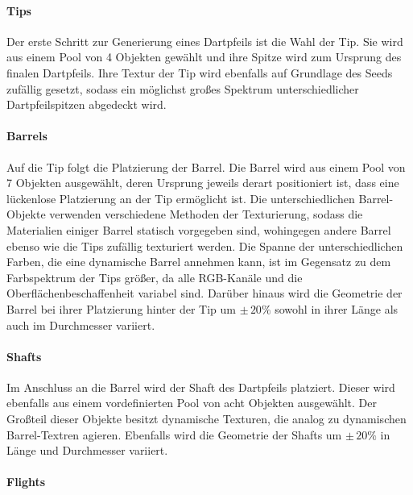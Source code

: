 \paragraph{Tips}

Der erste Schritt zur Generierung eines Dartpfeils ist die Wahl der Tip. Sie wird aus einem Pool von 4 Objekten gewählt und ihre Spitze wird zum Ursprung des finalen Dartpfeils. Ihre Textur der Tip wird ebenfalls auf Grundlage des Seeds zufällig gesetzt, sodass ein möglichst großes Spektrum unterschiedlicher Dartpfeilspitzen abgedeckt wird.

\paragraph{Barrels}

Auf die Tip folgt die Platzierung der Barrel. Die Barrel wird aus einem Pool von 7 Objekten ausgewählt, deren Ursprung jeweils derart positioniert ist, dass eine lückenlose Platzierung an der Tip ermöglicht ist. Die unterschiedlichen Barrel-Objekte verwenden verschiedene Methoden der Texturierung, sodass die Materialien einiger Barrel statisch vorgegeben sind, wohingegen andere Barrel ebenso wie die Tips zufällig texturiert werden. Die Spanne der unterschiedlichen Farben, die eine dynamische Barrel annehmen kann, ist im Gegensatz zu dem Farbspektrum der Tips größer, da alle RGB-Kanäle und die Oberflächenbeschaffenheit variabel sind. Darüber hinaus wird die Geometrie der Barrel bei ihrer Platzierung hinter der Tip um $\pm\,20\%$ sowohl in ihrer Länge als auch im Durchmesser variiert.

\paragraph{Shafts}

Im Anschluss an die Barrel wird der Shaft des Dartpfeils platziert. Dieser wird ebenfalls aus einem vordefinierten Pool von acht Objekten ausgewählt. Der Großteil dieser Objekte besitzt dynamische Texturen, die analog zu dynamischen Barrel-Textren agieren. Ebenfalls wird die Geometrie der Shafts um $\pm\,20\%$ in Länge und Durchmesser variiert.

\paragraph{Flights}

